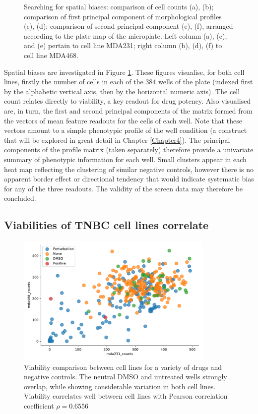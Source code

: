 \begin{figure}
    \caption{Searching for spatial biases: comparison of cell counts (a), (b); comparison of first principal component of morphological profiles (c), (d); comparison of second principal component (e), (f), arranged according to the plate map of the microplate. Left column (a), (c), and (e) pertain to cell line MDA231; right column (b), (d), (f) to cell line MDA468.}
    \label{fig:plateeffects}%
\end{figure}

Spatial biases are investigated in Figure \ref{fig:plateeffects}. These figures visualise, for both cell lines, firstly the number of cells in each of the $384$ wells of the plate (indexed first by the alphabetic vertical axis, then by the horizontal numeric axis). The cell count relates directly to viability, a key readout for drug potency. Also visualised are, in turn, the first and second principal components of the matrix formed from the vectors of mean feature readouts for the cells of each well. Note that these vectors amount to a simple phenotypic profile of the well condition (a construct that will be explored in great detail in Chapter \ref{Chapter4}). The principal components of the profile matrix (taken separately) therefore provide a univariate summary of phenotypic information for each well. Small clusters appear in each heat map reflecting the clustering of similar negative controls, however there is no apparent border effect or directional tendency that would indicate systematic bias for any of the three readouts. The validity of the screen data may therefore be concluded.

\subsection{Viabilities of TNBC cell lines correlate}
\label{subsec:viability}

\begin{figure}
\centering
\includegraphics[width=0.85\textwidth]{img/viability.pdf}
\caption{Viability comparison between cell lines for a variety of drugs and negative controls. The neutral DMSO and untreated wells strongly overlap, while showing considerable variation in both cell lines. Viability correlates well between cell lines with Pearson correlation coefficient $\rho = 0.6556$}
\label{fig:viability}
\end{figure}

